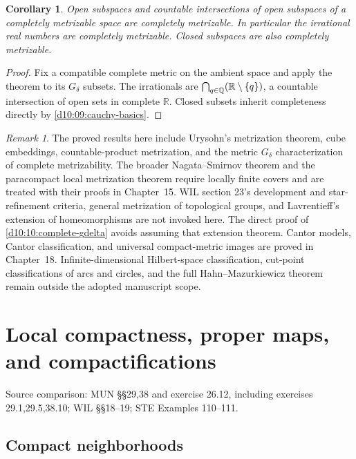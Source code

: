 \documentclass[11pt,oneside,openany]{book}
\newtheorem{corollary}[theorem]{Corollary}
\theoremstyle{definition}
\theoremstyle{remark}
\newtheorem{remark}[theorem]{Remark}
\newcommand{\R}{\mathbb R}\newcommand{\C}{\mathbb C}
\newcommand{\source}[1]{\par\begingroup\small\sffamily\color{black!65}Source comparison: #1\par\endgroup}
\begin{document}
\begin{corollary}\label{d10:10:open-gdelta-complete}
Open subspaces and countable intersections of open subspaces of a completely metrizable space are completely metrizable. In particular the irrational real numbers are completely metrizable. Closed subspaces are also completely metrizable.
\end{corollary}
\begin{proof}
Fix a compatible complete metric on the ambient space and apply the theorem to its $G_\delta$ subsets. The irrationals are $\bigcap_{q\in\Q}(\R\setminus\{q\})$, a countable intersection of open sets in complete $\R$. Closed subsets inherit completeness directly by \cref{d10:09:cauchy-basics}.
\end{proof}

\begin{remark}\label{d10:10:metrization-scope}
The proved results here include Urysohn's metrization theorem, cube embeddings, countable-product metrization, and the metric $G_\delta$ characterization of complete metrizability. The broader Nagata--Smirnov theorem and the paracompact local metrization theorem require locally finite covers and are treated with their proofs in Chapter~15. WIL section 23's development and star-refinement criteria, general metrization of topological groups, and Lavrentieff's extension of homeomorphisms are not invoked here. The direct proof of \cref{d10:10:complete-gdelta} avoids assuming that extension theorem. Cantor models, Cantor classification, and universal compact-metric images are proved in Chapter~18. Infinite-dimensional Hilbert-space classification, cut-point classifications of arcs and circles, and the full Hahn--Mazurkiewicz theorem remain outside the adopted manuscript scope.
\end{remark}



\chapter[Local compactness and compactifications]{Local compactness, proper maps, and compactifications}\label{ch:d10-11}
\source{MUN \S\S29,38 and exercise 26.12, including exercises 29.1,29.5,38.10; WIL \S\S18--19; STE Examples 110--111.}

\section{Compact neighborhoods}
\end{document}
